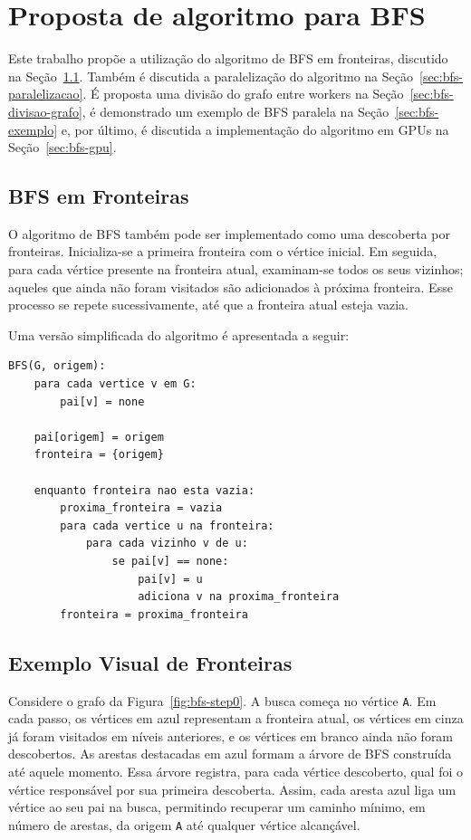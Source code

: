 \section{Proposta de algoritmo para BFS}
Este trabalho propõe a utilização do algoritmo de BFS em fronteiras, discutido na
Seção~\ref{sec:bfs-fronteira}. Também é discutida a paralelização do algoritmo
na Seção~\ref{sec:bfs-paralelizacao}. É proposta uma divisão do grafo entre
workers na Seção~\ref{sec:bfs-divisao-grafo}, é demonstrado um exemplo de BFS
paralela na Seção~\ref{sec:bfs-exemplo} e, por último, é discutida a
implementação do algoritmo em GPUs na Seção~\ref{sec:bfs-gpu}.

\subsection{BFS em Fronteiras}
\label{sec:bfs-fronteira}
O algoritmo de BFS também pode ser implementado como uma descoberta por fronteiras. Inicializa-se a primeira fronteira com o vértice inicial. Em seguida, para cada vértice presente na fronteira atual, examinam-se todos os seus vizinhos; aqueles que ainda não foram visitados são adicionados à próxima fronteira. Esse processo se repete sucessivamente, até que a fronteira atual esteja vazia.

Uma versão simplificada do algoritmo é apresentada a seguir:

\begin{lstlisting}
BFS(G, origem):
    para cada vertice v em G:
        pai[v] = none

    pai[origem] = origem
    fronteira = {origem}

    enquanto fronteira nao esta vazia:
        proxima_fronteira = vazia
        para cada vertice u na fronteira:
            para cada vizinho v de u:
                se pai[v] == none:
                    pai[v] = u
                    adiciona v na proxima_fronteira
        fronteira = proxima_fronteira
\end{lstlisting}

\subsection{Exemplo Visual de Fronteiras}

Considere o grafo da Figura~\ref{fig:bfs-step0}. A busca começa no vértice
\texttt{A}. Em cada passo, os vértices em azul representam a fronteira atual,
os vértices em cinza já foram visitados em níveis anteriores, e os vértices em
branco ainda não foram descobertos. As arestas destacadas em azul formam a
árvore de BFS construída até aquele momento. Essa árvore registra, para cada
vértice descoberto, qual foi o vértice responsável por sua primeira descoberta.
Assim, cada aresta azul liga um vértice ao seu pai na busca, permitindo recuperar
um caminho mínimo, em número de arestas, da origem \texttt{A} até qualquer
vértice alcançável.

